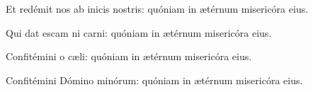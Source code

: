 \item Et redémit nos ab inicis nostris:\psstar{} quóniam in ætérnum misericóra eius.

\item Qui dat escam ni carni:\psstar{} quóniam in ætérnum misericóra eius.

\item Confitémini o cæli:\psstar{} quóniam in ætérnum misericóra eius.

\item Confitémini Dómino minórum:\psstar{} quóniam in ætérnum misericóra eius.

